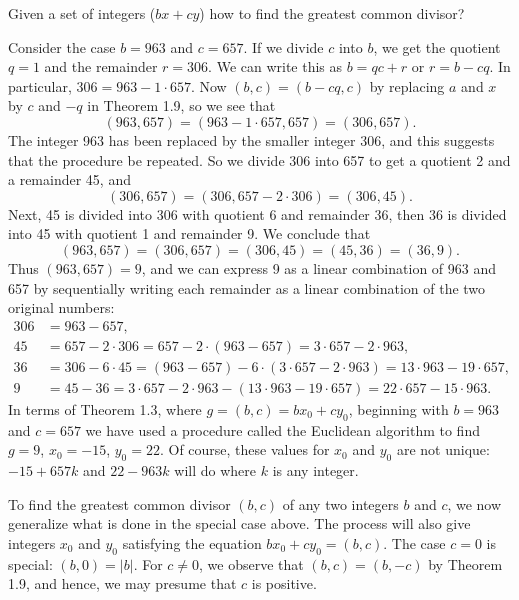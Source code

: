 \documentclass[11pt]{article}
\begin{document}
\begin{question}
    Given a set of integers (\(bx + cy\)) how to find the greatest common divisor?
\end{question}
Consider the case \(b = 963\) and \(c = 657\). If we divide \(c\) into \(b\), we get the quotient \(q = 1\) and the remainder \(r = 306\). We can write this as \(b = qc + r\) or \(r = b - cq\). In particular, \(306 = 963 - 1 \cdot 657\). Now \((b, c) = (b - cq, c)\) by replacing \(a\) and \(x\) by \(c\) and \(-q\) in Theorem 1.9, so we see that
\[
    (963, 657) = (963 - 1 \cdot 657, 657) = (306, 657).
\]
The integer 963 has been replaced by the smaller integer 306, and this suggests
that the procedure be repeated. So we divide 306 into 657 to get a quotient 2
and a remainder 45, and
\[
    (306, 657) = (306, 657 - 2 \cdot 306) = (306, 45).
\]
Next, 45 is divided into 306 with quotient 6 and remainder 36, then 36 is
divided into 45 with quotient 1 and remainder 9. We conclude that
\[
    (963, 657) = (306, 657) = (306, 45) = (45, 36) = (36, 9).
\]
Thus \((963, 657) = 9\), and we can express 9 as a linear combination of 963
and 657 by sequentially writing each remainder as a linear combination of the
two original numbers:
\[
    \begin{aligned}
        306 & = 963 - 657,                                                                                          \\
        45  & = 657 - 2 \cdot 306 = 657 - 2 \cdot (963 - 657) = 3 \cdot 657 - 2 \cdot 963,                          \\
        36  & = 306 - 6 \cdot 45 = (963 - 657) - 6 \cdot (3 \cdot 657 - 2 \cdot 963) = 13 \cdot 963 - 19 \cdot 657, \\
        9   & = 45 - 36 = 3 \cdot 657 - 2 \cdot 963 - (13 \cdot 963 - 19 \cdot 657) = 22 \cdot 657 - 15 \cdot 963.
    \end{aligned}
\]
In terms of Theorem 1.3, where \(g = (b, c) = bx_0 + cy_0\), beginning with \(b
= 963\) and \(c = 657\) we have used a procedure called the Euclidean algorithm
to find \(g = 9\), \(x_0 = -15\), \(y_0 = 22\). Of course, these values for
\(x_0\) and \(y_0\) are not unique: \(-15 + 657k\) and \(22 - 963k\) will do
where \(k\) is any integer.

To find the greatest common divisor \((b, c)\) of any two integers \(b\) and
\(c\), we now generalize what is done in the special case above. The process
will also give integers \(x_0\) and \(y_0\) satisfying the equation \(bx_0 +
cy_0 = (b, c)\). The case \(c = 0\) is special: \((b, 0) = |b|\). For \(c \neq
0\), we observe that \((b, c) = (b, -c)\) by Theorem 1.9, and hence, we may
presume that \(c\) is positive.
\end{document}
